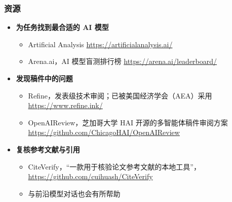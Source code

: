 \documentclass[aspectratio=169]{beamer}
\begin{document}
\begin{frame}
  \frametitle{资源}
  \begin{itemize}
      \item \textbf{为任务找到最合适的 AI 模型}
        \begin{itemize}
          \item Artificial Analysis \url{https://artificialanalysis.ai/}
          \item Arena.ai，AI 模型盲测排行榜 \url{https://arena.ai/leaderboard/}
        \end{itemize}
      \item \textbf{发现稿件中的问题}
        \begin{itemize}
          \item Refine，发表级技术审阅；已被美国经济学会（AEA）采用 \url{https://www.refine.ink/}
          \item OpenAIReview，芝加哥大学 HAI 开源的多智能体稿件审阅方案 \url{https://github.com/ChicagoHAI/OpenAIReview}
          \end{itemize}
      \item \textbf{复核参考文献与引用}
        \begin{itemize}
          \item CiteVerify，“一款用于核验论文参考文献的本地工具”，\url{https://github.com/cuihuash/CiteVerify}
          \item 与前沿模型对话也会有所帮助
          \end{itemize}
  \end{itemize}
\end{frame}
\end{document}
